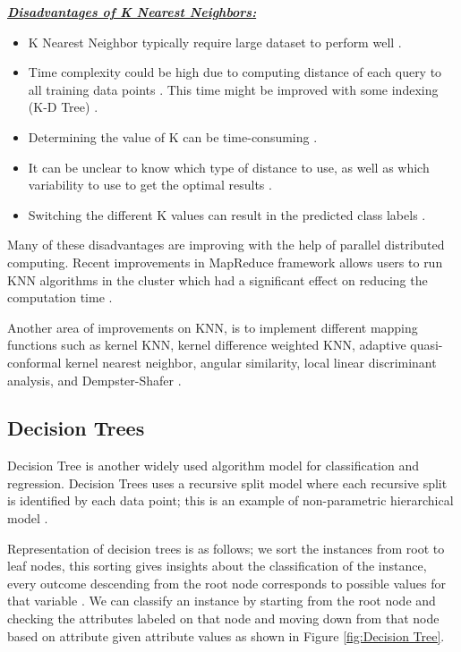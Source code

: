 \documentclass[sigconf]{acmart}
\begin{document}
\textbf{\underline{\textit{Disadvantages of K Nearest Neighbors:}}}

\begin{itemize}
\item K Nearest Neighbor typically require large dataset to perform well \cite{www-cs.man}. 
\item Time complexity could be high due to computing distance of each query to all training data points \cite{www-revoledu}. This time might be improved with some indexing (K-D Tree) \cite{www-revoledu}.
\item Determining the value of K can be time-consuming \cite{www-revoledu}. 
\item It can be unclear to know which type of distance to use, as well as which variability to use to get the optimal results \cite{www-revoledu}. 
\item Switching the different K values can result in the predicted class labels \cite{www-nickgillian}. 
\end{itemize}

Many of these disadvantages are improving with the help of parallel distributed computing. Recent improvements in MapReduce framework allows users to run KNN algorithms in the cluster which had a significant effect on reducing the computation time \cite{knn-chung}.

\par Another area of improvements on KNN, is to implement different mapping functions such as kernel KNN, kernel difference weighted KNN, adaptive quasi-conformal kernel nearest neighbor, angular similarity, local linear discriminant analysis, and Dempster-Shafer \cite{ERTUGRUL2017480}. 

\subsection{Decision Trees}
 
Decision Tree is another widely used algorithm model for classification and regression. Decision Trees uses a recursive split model where each recursive split is identified by each data point; this is an example of non-parametric hierarchical model \cite{HASSAN201752}. 
\par Representation of decision trees is as follows; we sort the instances from root to leaf nodes, this sorting gives insights about the classification of the instance, every outcome descending from the root node corresponds to possible values for that variable \cite{www-cs.princeton}. We can classify an instance by starting from the root node and checking the attributes labeled on that node and moving down from that node based on attribute given attribute values \cite{www-cs.princeton} as shown in Figure \ref{fig:Decision Tree}. 
\end{document}
